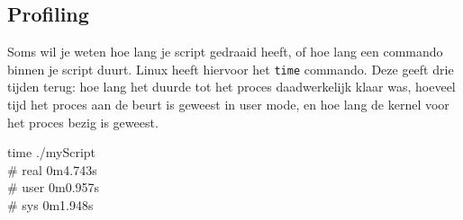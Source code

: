 \subsection{Profiling}\label{profiling}

Soms wil je weten hoe lang je script gedraaid heeft, of hoe lang een commando binnen je script duurt. Linux heeft hiervoor het \texttt{time} commando. Deze geeft drie tijden terug: hoe lang het duurde tot het proces daadwerkelijk klaar was, hoeveel tijd het proces aan de beurt is geweest in user mode, en hoe lang de kernel voor het proces bezig is geweest.

\begin{bash}
\userprompt time ./myScript\\
\# real    0m4.743s\\
\# user    0m0.957s\\
\# sys     0m1.948s\\
\end{bash}
